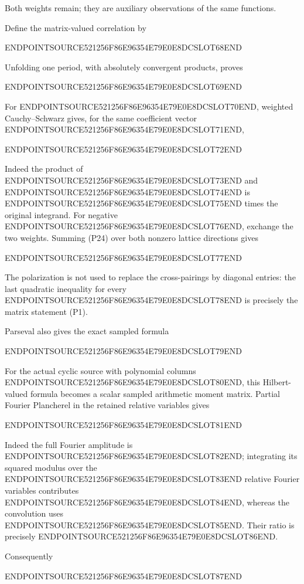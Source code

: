 Both weights remain; they are auxiliary observations of the same functions.

Define the matrix-valued correlation by

ENDPOINTSOURCE521256F86E96354E79E0E8DCSLOT68END

Unfolding one period, with absolutely convergent products, proves

ENDPOINTSOURCE521256F86E96354E79E0E8DCSLOT69END

For ENDPOINTSOURCE521256F86E96354E79E0E8DCSLOT70END, weighted Cauchy--Schwarz gives, for the same coefficient vector ENDPOINTSOURCE521256F86E96354E79E0E8DCSLOT71END,

ENDPOINTSOURCE521256F86E96354E79E0E8DCSLOT72END

Indeed the product of ENDPOINTSOURCE521256F86E96354E79E0E8DCSLOT73END and ENDPOINTSOURCE521256F86E96354E79E0E8DCSLOT74END is ENDPOINTSOURCE521256F86E96354E79E0E8DCSLOT75END times the original integrand. For negative ENDPOINTSOURCE521256F86E96354E79E0E8DCSLOT76END, exchange the two weights. Summing (P24) over both nonzero lattice directions gives

ENDPOINTSOURCE521256F86E96354E79E0E8DCSLOT77END

The polarization is not used to replace the cross-pairings by diagonal entries: the last quadratic inequality for every ENDPOINTSOURCE521256F86E96354E79E0E8DCSLOT78END is precisely the matrix statement (P1).

Parseval also gives the exact sampled formula

ENDPOINTSOURCE521256F86E96354E79E0E8DCSLOT79END

For the actual cyclic source with polynomial columns ENDPOINTSOURCE521256F86E96354E79E0E8DCSLOT80END, this Hilbert-valued formula becomes a scalar sampled arithmetic moment matrix. Partial Fourier Plancherel in the retained relative variables gives

ENDPOINTSOURCE521256F86E96354E79E0E8DCSLOT81END

Indeed the full Fourier amplitude is ENDPOINTSOURCE521256F86E96354E79E0E8DCSLOT82END; integrating its squared modulus over the ENDPOINTSOURCE521256F86E96354E79E0E8DCSLOT83END relative Fourier variables contributes ENDPOINTSOURCE521256F86E96354E79E0E8DCSLOT84END, whereas the convolution uses ENDPOINTSOURCE521256F86E96354E79E0E8DCSLOT85END. Their ratio is precisely ENDPOINTSOURCE521256F86E96354E79E0E8DCSLOT86END.

Consequently

ENDPOINTSOURCE521256F86E96354E79E0E8DCSLOT87END

